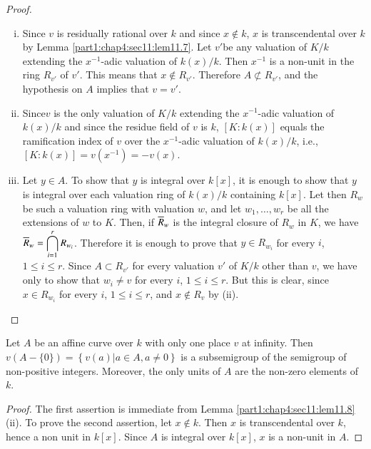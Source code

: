 \begin{proof}
  ~
  \begin{enumerate}[(i)]
    \item Since $v$ is residually rational over $k$ and since $x
      \notin k$, $x$ is transcendental over $k$ by Lemma
      \ref{part1:chap4:sec11:lem11.7}. Let $v'$be any valuation of
      $K/k$ extending the $x^{-1}$-adic valuation of $k(x)/k$. Then
      $x^{-1}$ is a non-unit in the ring $R_{v'}$ of $v'$. This means
      that $x \notin R_{v'}$. Therefore $A \nsubset R_{v'}$, and the
      hypothesis on $A$ implies that $v=v'$.

      \item Since\pageoriginale $v$ is the only valuation of $K/k$
        extending the $x^{-1}$-adic valuation of $k(x)/k$ and since
        the residue field of $v$ is $k$, $[K: k(x)]$ equals the
        ramification index of $v$ over the $x^{-1}$-adic valuation of
        $k(x)/k$, i.e., $[K : k(x)] = v(x^{-1})=-v(x)$.

        \item Let $y \in A$. To show that $y$ is integral over $k[x]$,
          it is enough to show that $y$ is integral over each
          valuation ring of $k(x)/k$ containing $k[x]$. Let then $R_w$
          be such a valuation ring with valuation $w$, and let $w_1,
          \ldots , w_r$ be all the extensions of $w$ to $K$. Then, if
          $\overline{R}_w$  is the integral closure of $R_w$ in $K$, we have
          $\displaystyle{\overline{R}_w = \bigcap\limits^r_{i=1} R_{w_i}}$. Therefore
          it is enough to prove that $y \in R_{w_i}$ for every $i$, $1
          \leq i \leq r$. Since $A \subset R_{v'}$ for every valuation
          $v'$ of $K/k$ other than $v$, we have only to show that $w_i
          \neq v$ for every $i$, $1 \leq i \leq r$. But this is clear,
          since $x \in R_{w_i}$ for every $i$, $1 \leq i \leq r$, and
          $x \notin R_v$ by (ii).
  \end{enumerate}
\end{proof}

\begin{coro}\label{part1:chap4:sec11:coro11.9}
  Let $A$ be an affine curve over $k$ with only one place $v$ at
  infinity. Then $v (A - \{ 0\})= \left\{ v(a) \Big| a \in A, a \neq 0
  \right\}$ is a subsemigroup of the semigroup of non-positive
  integers. Moreover, the only units of $A$ are the non-zero elements
  of $k$.
\end{coro}

\begin{proof}
  The first assertion is immediate from
  Lemma \ref{part1:chap4:sec11:lem11.8} (ii). To prove the second
  assertion, let $x \notin k$. Then $x$ is transcendental over $k$,
  hence a non unit in $k[x]$. Since $A$ is integral over $k[x]$, $x$
  is a non-unit in $A$. 
\end{proof}

